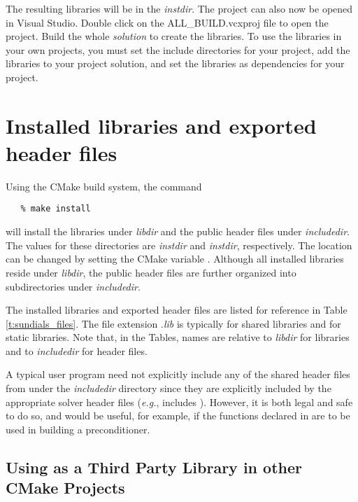 \noindent The resulting libraries will be in the {\em instdir}.
\noindent The {\sundials} project can also now be opened in Visual Studio.
Double click on the ALL\_BUILD.vcxproj file to open the project.
Build the whole {\em solution} to create the {\sundials} libraries.
To use the {\sundials} libraries in your own projects, you must
set the include directories for your project,
add the {\sundials} libraries to your project solution,
and set the {\sundials} libraries as dependencies for your project.

\section{Installed libraries and exported header files}

Using the CMake {\sundials} build system, the command
\begin{verbatim}
   % make install
\end{verbatim}
will install the libraries under {\em libdir} and the public header
files under {\em includedir}. The values for these directories are
{\em instdir} and {\em instdir},
respectively. The location can be changed by setting the CMake variable .
Although all installed libraries reside under {\em libdir}, the public
header files are further organized into subdirectories under {\em includedir}.

The installed libraries and exported header files are listed for
reference in Table \ref{t:sundials_files}.
The file extension .{\em lib}
is typically  for shared libraries and  for static libraries.
Note that, in the Tables, names are relative to {\em libdir}
for libraries and to {\em includedir} for header files.

A typical user program need not explicitly include any of the shared
{\sundials} header files from under the {\em includedir}
directory since they are explicitly included by the appropriate solver
header files ({\em e.g.},  includes
). However, it is both legal and safe to do so,
and would be useful, for example, if the functions declared in 
are to be used in building a preconditioner.

\subsection{Using {\sundials} as a Third Party Library in other CMake Projects}

